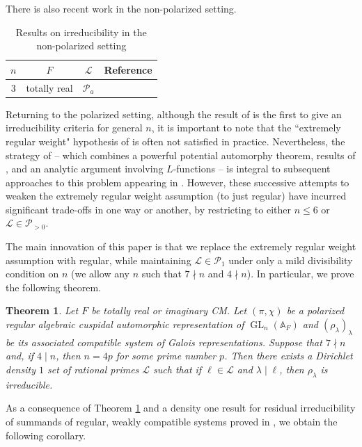 \documentclass{amsart}
\newtheorem{theorem}{Theorem}[section]
\theoremstyle{definition}
\numberwithin{equation}{section} %
\newcommand{\GL}{\operatorname{GL}}
\newcommand{\bb}[1]{\mathbb{#1}}
\newcommand{\mc}[1]{\mathcal{#1}}
\begin{document}
There is also recent work in the non-polarized setting.

\begin{table}[htbp]
    \centering
    \begin{tabular}{c|c|c|c}
         \( n \) & \( F \) & \( \mc{L} \) & Reference \\
         \hline
         \( 3 \) & totally real & \( \mc{P}_a \) & \cite{BocHui24}
    \end{tabular}
    \caption{Results on irreducibility in the non-polarized setting}
    \label{tab:non-polarized irreducibility results}
\end{table}

Returning to the polarized setting, although the result of \cite{BLGGT14} is the first to give an irreducibility criteria for general \( n \), it is important to note that the ``extremely regular weight" hypothesis of \cite{BLGGT14} is often not satisfied in practice. Nevertheless, the strategy of \cite{BLGGT14} -- which combines a powerful potential automorphy theorem, results of \cite{LarPin92}, and an analytic argument involving \( L \)-functions -- is integral to subsequent approaches to this problem appearing in \cite{PatTay15,Xia19,Hui23}. However, these successive attempts to weaken the extremely regular weight assumption (to just regular) have incurred significant trade-offs in one way or another, by restricting to either \( n\leq 6 \) or \( \mc{L}\in\mc{P}_{>0} \).

The main innovation of this paper is that we replace the extremely regular weight assumption with regular, while maintaining \( \mc{L}\in\mc{P}_1 \) under only a mild divisibility condition on \( n \) (we allow any \( n \) such that \( 7\nmid n \) and \( 4\nmid n \)). In particular, we prove the following theorem.

\begin{theorem} \label{thm: intro main theorem}
    Let \( F \) be totally real or imaginary CM. Let \( (\pi,\chi) \) be a polarized regular algebraic cuspidal automorphic representation of \( \GL_n(\bb{A}_F) \) and \( (\rho_\lambda)_\lambda \) be its associated compatible system of Galois representations. Suppose that \( 7\nmid n \) and, if \( 4\mid n \), then $n = 4p$ for some prime number $p$.
    Then there exists a Dirichlet density \( 1 \) set of rational primes \( \mc{L} \) such that if \( \ell \in \mc{L} \) and \( \lambda\mid\ell\), then \( \rho_\lambda \) is irreducible.
\end{theorem}

As a consequence of Theorem \ref{thm: intro main theorem} and a density one result for residual irreducibility of summands of regular, weakly compatible systems proved in \cite{BLGGT14}, we obtain the following corollary.
\end{document}
